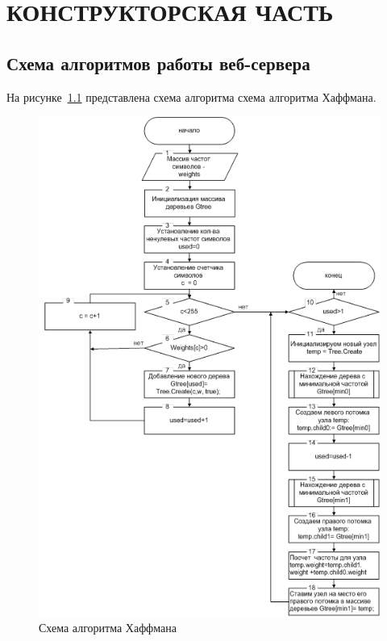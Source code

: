 \chapter{КОНСТРУКТОРСКАЯ ЧАСТЬ}


\section{Схема алгоритмов работы веб-сервера}

На рисунке~\ref{fig:algo-web-server} представлена схема алгоритма схема алгоритма Хаффмана.

\begin{figure}[H]
	\centering
	\includegraphics[width=0.8\linewidth]{img/haffman}
	\caption{Схема алгоритма Хаффмана}
	\label{fig:algo-web-server}
\end{figure}


